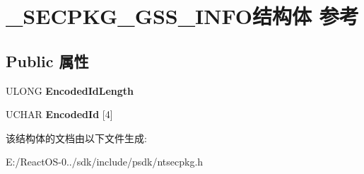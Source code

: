 \hypertarget{struct___s_e_c_p_k_g___g_s_s___i_n_f_o}{}\section{\+\_\+\+S\+E\+C\+P\+K\+G\+\_\+\+G\+S\+S\+\_\+\+I\+N\+F\+O结构体 参考}
\label{struct___s_e_c_p_k_g___g_s_s___i_n_f_o}
\subsection*{Public 属性}
\begin{DoxyCompactItemize}
\item 
\mbox{\label{struct___s_e_c_p_k_g___g_s_s___i_n_f_o_af88c90c5326a1adc06763250f0e46e2b}} 
U\+L\+O\+NG {\bfseries Encoded\+Id\+Length}
\item 
\mbox{\label{struct___s_e_c_p_k_g___g_s_s___i_n_f_o_aafbc971b391d8204c1063b576b1d3e02}} 
U\+C\+H\+AR {\bfseries Encoded\+Id} \mbox{[}4\mbox{]}
\end{DoxyCompactItemize}


该结构体的文档由以下文件生成\+:\begin{DoxyCompactItemize}
\item 
E\+:/\+React\+O\+S-\/0../sdk/include/psdk/ntsecpkg.\+h\end{DoxyCompactItemize}
